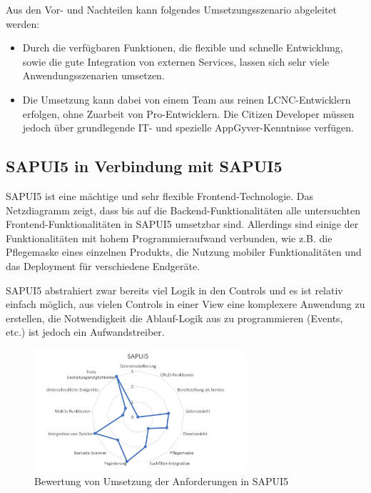 Aus den Vor- und Nachteilen kann folgendes Umsetzungsszenario abgeleitet werden:
\begin{itemize} 
  \item Durch die verfügbaren Funktionen, die flexible und schnelle Entwicklung, sowie die gute Integration von externen Services, lassen sich sehr viele Anwendungsszenarien umsetzen.
  \item Die Umsetzung kann dabei von einem Team aus reinen LCNC-Entwicklern erfolgen, ohne Zuarbeit von Pro-Entwicklern. Die Citizen Developer müssen jedoch über grundlegende IT- und spezielle AppGyver-Kenntnisse verfügen. 
\end{itemize}

\subsection{SAPUI5 in Verbindung mit SAPUI5}
SAPUI5 ist eine mächtige und sehr flexible Frontend-Technologie. Das Netzdiagramm zeigt, dass bis auf die Backend-Funktionalitäten alle untersuchten Frontend-Funktionalitäten in SAPUI5 umsetzbar sind. Allerdings  sind einige der Funktionalitäten mit hohem Programmieraufwand verbunden, wie z.B. die Pflegemaske eines einzelnen Produkts, die Nutzung mobiler Funktionalitäten und das Deployment für verschiedene Endgeräte.

SAPUI5 abstrahiert zwar bereits viel Logik in den Controls und es ist relativ einfach möglich, aus vielen Controls in einer View eine komplexere Anwendung zu erstellen, die Notwendigkeit die Ablauf-Logik aus zu programmieren (Events, etc.) ist jedoch ein Aufwandstreiber.
\begin{figure}[!htbp]
 \centering
 \includegraphics[width=0.7\textwidth]{Bilder/bewertung/ND_UI5.jpg}
 \caption{Bewertung von Umsetzung der Anforderungen in SAPUI5}
\end{figure}


